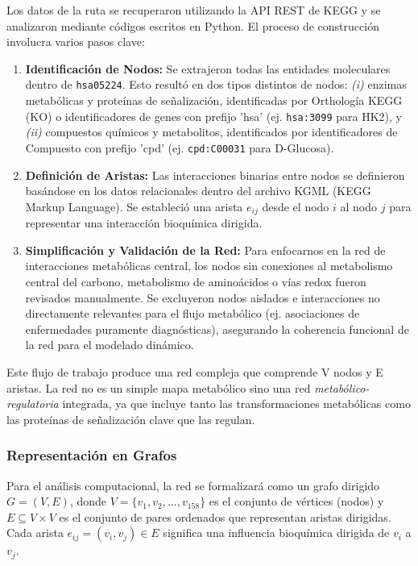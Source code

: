 \documentclass[12pt,spanish]{article}
\begin{document}
	Los datos de la ruta se recuperaron utilizando la API REST de KEGG y se analizaron mediante códigos escritos en Python. El proceso de construcción involucra varios pasos clave:
	\begin{enumerate}
		\item \textbf{Identificación de Nodos:} Se extrajeron todas las entidades moleculares dentro de \texttt{hsa05224}. Esto resultó en dos tipos distintos de nodos: \textit{(i)} enzimas metabólicas y proteínas de señalización, identificadas por Orthología KEGG (KO) o identificadores de genes con prefijo 'hsa' (ej. \texttt{hsa:3099} para HK2), y \textit{(ii)} compuestos químicos y metabolitos, identificados por identificadores de Compuesto con prefijo 'cpd' (ej. \texttt{cpd:C00031} para D-Glucosa).
		\item \textbf{Definición de Aristas:} Las interacciones binarias entre nodos se definieron basándose en los datos relacionales dentro del archivo KGML (KEGG Markup Language). Se estableció una arista $e_{ij}$ desde el nodo $i$ al nodo $j$ para representar una interacción bioquímica dirigida. 
		\item \textbf{Simplificación y Validación de la Red:} Para enfocarnos en la red de interacciones metabólicas central, los nodos sin conexiones al metabolismo central del carbono, metabolismo de aminoácidos o vías redox fueron revisados manualmente. Se excluyeron nodos aislados e interacciones no directamente relevantes para el flujo metabólico (ej. asociaciones de enfermedades puramente diagnósticas), asegurando la coherencia funcional de la red para el modelado dinámico.
	\end{enumerate}
	
	Este flujo de trabajo produce una red compleja que comprende V nodos y E aristas. La red no es un simple mapa metabólico sino una red \textit{metabólico-regulatoria} integrada, ya que incluye tanto las transformaciones metabólicas como las proteínas de señalización clave que las regulan.
	
	\subsubsection{Representación en Grafos}
	Para el análisis computacional, la red se formalizará como un grafo dirigido $G = (V, E)$, donde $V = \{v_1, v_2, ..., v_{158}\}$ es el conjunto de vértices (nodos) y $E \subseteq V \times V$ es el conjunto de pares ordenados que representan aristas dirigidas. Cada arista $e_{ij} = (v_i, v_j) \in E$ significa una influencia bioquímica dirigida de $v_i$ a $v_j$.
	
\end{document}
